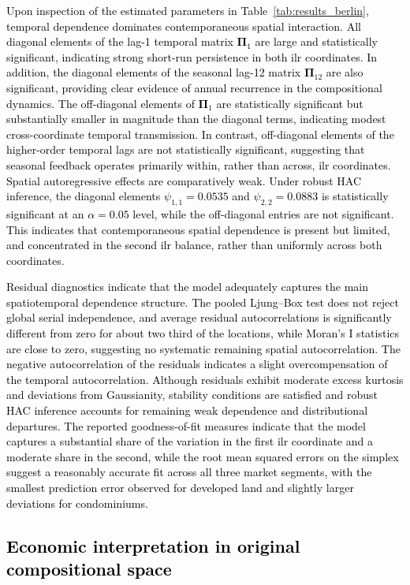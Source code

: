 \documentclass[12pt]{article}
\theoremstyle{plain}
\theoremstyle{definition}
\newcommand{\xmat}{\mathbf}
\begin{document}
\textcolor{black}{Upon inspection of the estimated parameters in Table~\ref{tab:results_berlin}, temporal dependence dominates contemporaneous spatial interaction. All diagonal elements of the lag-1 temporal matrix $\xmat{\Pi}_{1}$ are large and statistically significant, indicating strong short-run persistence in both ilr coordinates. In addition, the diagonal elements of the seasonal lag-12 matrix $\xmat{\Pi}_{12}$ are also significant, providing clear evidence of annual recurrence in the compositional dynamics. The off-diagonal elements of $\xmat{\Pi}_{1}$ are statistically significant but substantially smaller in magnitude than the diagonal terms, indicating modest cross-coordinate temporal transmission. In contrast, off-diagonal elements of the higher-order temporal lags are not statistically significant, suggesting that seasonal feedback operates primarily within, rather than across, ilr coordinates. Spatial autoregressive effects are comparatively weak. Under robust HAC inference, the diagonal elements $\psi_{1,1}=0.0535$ and $\psi_{2,2}=0.0883$ is statistically significant at an $\alpha=0.05$ level, while the off-diagonal entries are not significant. This indicates that contemporaneous spatial dependence is present but limited, and concentrated in the second ilr balance, rather than uniformly across both coordinates.}

\textcolor{black}{Residual diagnostics indicate that the model adequately captures the main spatiotemporal dependence structure. The pooled Ljung–Box test does not reject global serial independence, and average residual autocorrelations is significantly different from zero for about two third of the locations, while Moran’s I statistics are close to zero, suggesting no systematic remaining spatial autocorrelation. The negative autocorrelation of the residuals indicates a slight overcompensation of the temporal autocorrelation. Although residuals exhibit moderate excess kurtosis and deviations from Gaussianity, stability conditions are satisfied and robust HAC inference accounts for remaining weak dependence and distributional departures. The reported goodness-of-fit measures indicate that the model captures a substantial share of the variation in the first ilr coordinate and a moderate share in the second, while the root mean squared errors on the simplex suggest a reasonably accurate fit across all three market segments, with the smallest prediction error observed for developed land and slightly larger deviations for condominiums.}

\subsection{\textcolor{black}{Economic interpretation in original compositional space}}\label{sec:berlin2}
\end{document}
